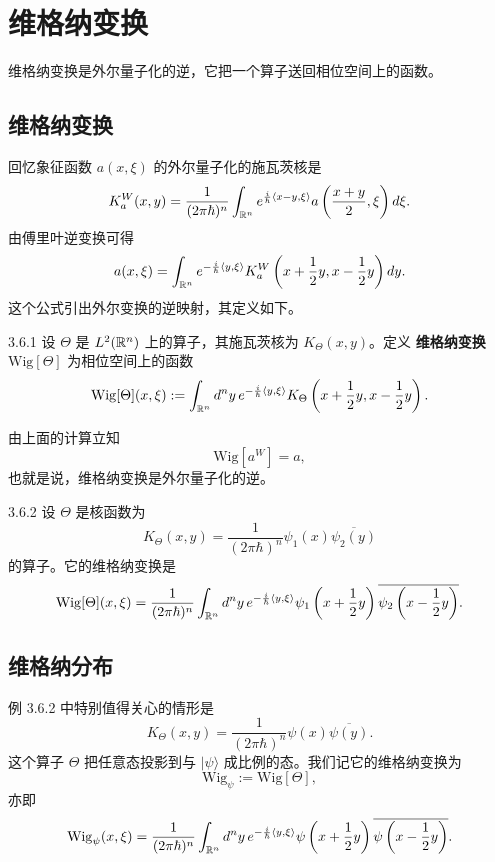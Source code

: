 \section{维格纳变换}

维格纳变换是外尔量子化的逆，它把一个算子送回相位空间上的函数。

\subsection{维格纳变换}

回忆象征函数 \(a(x,\xi)\) 的外尔量子化的施瓦茨核是
\[
  K_a^W(x,y)=\frac{1}{(2\pi\hbar)^n}
  \int_{\mathbb{R}^n}e^{\frac{i}{\hbar}\langle x-y,\xi\rangle}
  a\left(\frac{x+y}{2},\xi\right)d\xi.
\]
由傅里叶逆变换可得
\[
  a(x,\xi)=\int_{\mathbb{R}^n}e^{-\frac{i}{\hbar}\langle y,\xi\rangle}
  K_a^W\left(x+\frac12y,x-\frac12y\right)dy.
\]
这个公式引出外尔变换的逆映射，其定义如下。

\begin{definition}{3.6.1}
  设 \(\Theta\) 是 \(L^2(\mathbb{R}^n)\) 上的算子，其施瓦茨核为 \(K_\Theta(x,y)\)。定义 \textbf{维格纳变换} \(\mathrm{Wig}[\Theta]\) 为相位空间上的函数
  \[
    \mathrm{Wig}[\Theta](x,\xi)
    :=\int_{\mathbb{R}^n}d^ny\,e^{-\frac{i}{\hbar}\langle y,\xi\rangle}
    K_\Theta\left(x+\frac12y,x-\frac12y\right).
  \]
\end{definition}

由上面的计算立知
\[
  \mathrm{Wig}\left[a^W\right]=a,
\]
也就是说，维格纳变换是外尔量子化的逆。

\begin{example}{3.6.2}
  设 \(\Theta\) 是核函数为
  \[
    K_\Theta(x,y)=\frac{1}{(2\pi\hbar)^n}
    \psi_1(x)\overline{\psi_2(y)}
  \]
  的算子。它的维格纳变换是
  \[
    \mathrm{Wig}[\Theta](x,\xi)
    =\frac{1}{(2\pi\hbar)^n}\int_{\mathbb{R}^n}d^ny\,
    e^{-\frac{i}{\hbar}\langle y,\xi\rangle}
    \psi_1\left(x+\frac12y\right)
    \overline{\psi_2\left(x-\frac12y\right)}.
  \]
\end{example}

\subsection{维格纳分布}

例 3.6.2 中特别值得关心的情形是
\[
  K_\Theta(x,y)=\frac{1}{(2\pi\hbar)^n}\psi(x)\overline{\psi(y)}.
\]
这个算子 \(\Theta\) 把任意态投影到与 \(|\psi\rangle\) 成比例的态。我们记它的维格纳变换为
\[
  \mathrm{Wig}_\psi:=\mathrm{Wig}[\Theta],
\]
亦即
\[
  \mathrm{Wig}_\psi(x,\xi)
  =\frac{1}{(2\pi\hbar)^n}\int_{\mathbb{R}^n}d^ny\,
  e^{-\frac{i}{\hbar}\langle y,\xi\rangle}
  \psi\left(x+\frac12y\right)
  \overline{\psi\left(x-\frac12y\right)}.
\]

